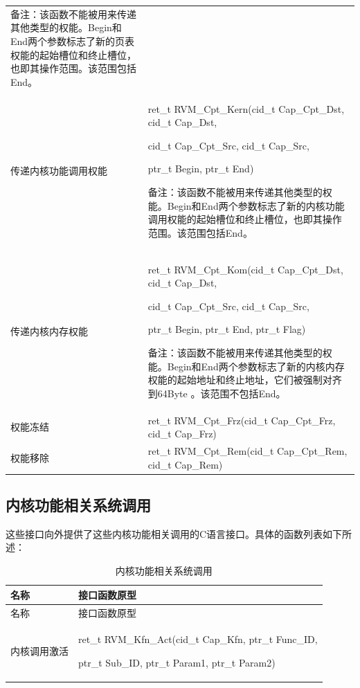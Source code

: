 \begin{xltabular}{\textwidth}{@{}>{\hsize\raggedright\arraybackslash}X>{\hsize\raggedright\arraybackslash}X@{}}
备注：该函数不能被用来传递其他类型的权能。Begin和End两个参数标志了新的页表权能的起始槽位和终止槽位，也即其操作范围。该范围包括End。\strut
\tabularnewline
传递内核功能调用权能\strut
 & ret\_\allowbreak{}t RVM\_\allowbreak{}Cpt\_\allowbreak{}Kern(cid\_\allowbreak{}t Cap\_\allowbreak{}Cpt\_\allowbreak{}Dst, cid\_\allowbreak{}t Cap\_\allowbreak{}Dst,

cid\_\allowbreak{}t Cap\_\allowbreak{}Cpt\_\allowbreak{}Src, cid\_\allowbreak{}t Cap\_\allowbreak{}Src,

ptr\_\allowbreak{}t Begin, ptr\_\allowbreak{}t End)

备注：该函数不能被用来传递其他类型的权能。Begin和End两个参数标志了新的内核功能调用权能的起始槽位和终止槽位，也即其操作范围。该范围包括End。\strut
\tabularnewline
传递内核内存权能\strut
 & ret\_\allowbreak{}t RVM\_\allowbreak{}Cpt\_\allowbreak{}Kom(cid\_\allowbreak{}t Cap\_\allowbreak{}Cpt\_\allowbreak{}Dst, cid\_\allowbreak{}t Cap\_\allowbreak{}Dst,

cid\_\allowbreak{}t Cap\_\allowbreak{}Cpt\_\allowbreak{}Src, cid\_\allowbreak{}t Cap\_\allowbreak{}Src,

ptr\_\allowbreak{}t Begin, ptr\_\allowbreak{}t End, ptr\_\allowbreak{}t Flag)

备注：该函数不能被用来传递其他类型的权能。Begin和End两个参数标志了新的内核内存权能的起始地址和终止地址，它们被强制对齐到64Byte
。该范围不包括End。\strut
\tabularnewline
权能冻结 & ret\_\allowbreak{}t RVM\_\allowbreak{}Cpt\_\allowbreak{}Frz(cid\_\allowbreak{}t Cap\_\allowbreak{}Cpt\_\allowbreak{}Frz, cid\_\allowbreak{}t
Cap\_\allowbreak{}Frz)\tabularnewline
权能移除 & ret\_\allowbreak{}t RVM\_\allowbreak{}Cpt\_\allowbreak{}Rem(cid\_\allowbreak{}t Cap\_\allowbreak{}Cpt\_\allowbreak{}Rem, cid\_\allowbreak{}t
Cap\_\allowbreak{}Rem)\tabularnewline
\end{xltabular}

\subsection{内核功能相关系统调用}\label{subsec:3-5-2}

这些接口向外提供了这些内核功能相关调用的C语言接口。具体的函数列表如下所述：

\begin{xltabular}{\textwidth}{@{}>{\hsize\raggedright\arraybackslash}X>{\hsize\raggedright\arraybackslash}X@{}}
\caption{内核功能相关系统调用}\label{tab:3-6}\\
\toprule
名称 & 接口函数原型\tabularnewline
\endfirsthead
\toprule
名称 & 接口函数原型\tabularnewline
\midrule
\endhead
\bottomrule
\endlastfoot
内核调用激活\strut
 & ret\_\allowbreak{}t RVM\_\allowbreak{}Kfn\_\allowbreak{}Act(cid\_\allowbreak{}t Cap\_\allowbreak{}Kfn, ptr\_\allowbreak{}t Func\_\allowbreak{}ID,

ptr\_\allowbreak{}t Sub\_\allowbreak{}ID, ptr\_\allowbreak{}t Param1, ptr\_\allowbreak{}t Param2)\strut
\tabularnewline
\end{xltabular}

